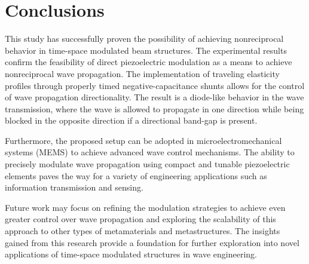\section{Conclusions}
\label{sec:conclusions}

This study has successfully proven the possibility of achieving nonreciprocal behavior in time-space modulated beam structures.
The experimental results confirm the feasibility of direct piezoelectric modulation as a means to achieve nonreciprocal wave propagation.
The implementation of traveling elasticity profiles through properly timed negative-capacitance shunts allows for the control of wave propagation directionality.
The result is a diode-like behavior in the wave transmission, where the wave is allowed to propagate in one direction while being blocked in the opposite direction if a directional band-gap is present.

Furthermore, the proposed setup can be adopted in microelectromechanical systems (MEMS) to achieve advanced wave control mechanisms.
The ability to precisely modulate wave propagation using compact and tunable piezoelectric elements paves the way for a variety of engineering applications such as information transmission and sensing.

Future work may focus on refining the modulation strategies to achieve even greater control over wave propagation and exploring the scalability of this approach to other types of metamaterials and metastructures.
The insights gained from this research provide a foundation for further exploration into novel applications of time-space modulated structures in wave engineering.

